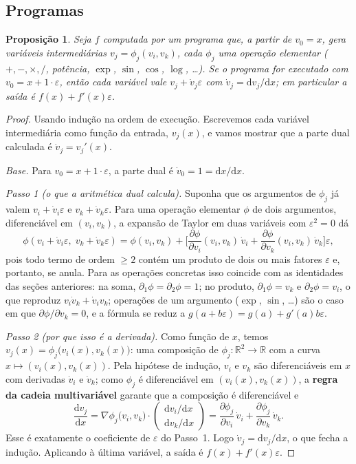\documentclass[11pt,a4paper]{article}
\newtheorem{proposicao}{Proposição}
\begin{document}
\subsection{Programas}
\begin{proposicao}
Seja $f$ computada por um programa que, a partir de $v_0=x$, gera variáveis intermediárias $v_j=\phi_j(v_{i}, v_{k})$, cada $\phi_j$ uma operação elementar ($+,-,\times,/$, potência, $\exp$, $\sin$, $\cos$, $\log$, \dots). Se o programa for executado com $v_0 = x+1\cdot\varepsilon$, então cada variável vale $v_j + \dot v_j\varepsilon$ com $\dot v_j = \mathrm dv_j/\mathrm dx$; em particular a saída é $f(x)+f'(x)\varepsilon$.
\end{proposicao}
\begin{proof}
Usando indução na ordem de execução. Escrevemos cada variável intermediária como função da entrada, $v_j(x)$, e vamos mostrar que a parte dual calculada é $\dot v_j = v_j'(x)$.

\emph{Base.} Para $v_0 = x + 1\cdot\varepsilon$, a parte dual é $\dot v_0 = 1 = \mathrm dx/\mathrm dx$.

\emph{Passo 1 (o que a aritmética dual calcula).} Suponha que os argumentos de $\phi_j$ já valem $v_i+\dot v_i\varepsilon$ e $v_k+\dot v_k\varepsilon$. Para uma operação elementar $\phi$ de dois argumentos, diferenciável em $(v_i,v_k)$, a expansão de Taylor em duas variáveis com $\varepsilon^2=0$ dá
\[
\phi(v_i+\dot v_i\varepsilon,\;v_k+\dot v_k\varepsilon) = \phi(v_i,v_k) + \Big[\frac{\partial\phi}{\partial v_i}(v_i,v_k)\,\dot v_i + \frac{\partial\phi}{\partial v_k}(v_i,v_k)\,\dot v_k\Big]\varepsilon ,
\]
pois todo termo de ordem $\ge2$ contém um produto de dois ou mais fatores $\varepsilon$ e, portanto, se anula. Para as operações concretas isso coincide com as identidades das seções anteriores: na soma, $\partial_1\phi=\partial_2\phi=1$; no produto, $\partial_1\phi = v_k$ e $\partial_2\phi = v_i$, o que reproduz $v_i\dot v_k + \dot v_iv_k$; operações de um argumento ($\exp$, $\sin$, \dots) são o caso em que $\partial\phi/\partial v_k=0$, e a fórmula se reduz a $g(a+b\varepsilon) = g(a)+g'(a)b\varepsilon$.

\emph{Passo 2 (por que isso é a derivada).} Como função de $x$, temos $v_j(x) = \phi_j\big(v_i(x), v_k(x)\big)$: uma composição de $\phi_j:\mathbb R^2\to\mathbb R$ com a curva $x\mapsto(v_i(x),v_k(x))$. Pela hipótese de indução, $v_i$ e $v_k$ são diferenciáveis em $x$ com derivadas $\dot v_i$ e $\dot v_k$; como $\phi_j$ é diferenciável em $(v_i(x),v_k(x))$, a \textbf{regra da cadeia multivariável} garante que a composição é diferenciável e
\[
\frac{\mathrm dv_j}{\mathrm dx} = \nabla\phi_j\big(v_i,v_k\big)\cdot\begin{pmatrix}\mathrm dv_i/\mathrm dx\\ \mathrm dv_k/\mathrm dx\end{pmatrix} = \frac{\partial\phi_j}{\partial v_i}\,\dot v_i + \frac{\partial\phi_j}{\partial v_k}\,\dot v_k .
\]
Esse é exatamente o coeficiente de $\varepsilon$ do Passo~1. Logo $\dot v_j = \mathrm dv_j/\mathrm dx$, o que fecha a indução. Aplicando à última variável, a saída é $f(x)+f'(x)\varepsilon$.
\end{proof}
\end{document}

